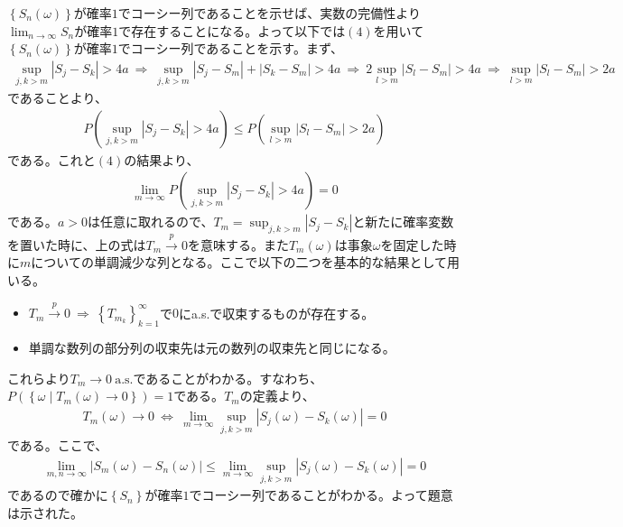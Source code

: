 \documentclass{article}
\begin{document}
$\left\{S_n(\omega)\right\}$が確率$1$でコーシー列であることを示せば、実数の完備性より$\lim_{n\to \infty} S_n$が確率$1$で存在することになる。よって以下では$(4)$を用いて$\left\{S_n(\omega)\right\}$が確率$1$でコーシー列であることを示す。まず、
\begin{align*}
	\sup_{j,k > m} \left| S_j - S_k \right| > 4a\ \Rightarrow\ \sup_{j,k > m} \left| S_j - S_m \right| + \left| S_k - S_m \right| > 4a\ \Rightarrow\ 2 \sup_{l > m} \left| S_l - S_m \right| > 4a\ \Rightarrow\ \sup_{l > m} \left| S_l - S_m \right| > 2a
\end{align*}
であることより、
\begin{align*}
	P\left( \sup_{j,k > m} \left| S_j - S_k \right| > 4a \right) \leq P\left( \sup_{l > m} \left| S_l - S_m \right| > 2a \right)
\end{align*}
である。これと$(4)$の結果より、
\begin{align*}
	\lim_{m \to \infty} P\left( \sup_{j,k > m} \left| S_j - S_k \right| > 4a \right) = 0
\end{align*}
である。$a > 0$は任意に取れるので、$T_m = \sup_{j,k > m} \left| S_j - S_k \right|$と新たに確率変数を置いた時に、上の式は$T_m \xrightarrow{p} 0$を意味する。また$T_m(\omega)$は事象$\omega$を固定した時に$m$についての単調減少な列となる。ここで以下の二つを基本的な結果として用いる。
\begin{itemize}
	\item $T_m \xrightarrow{p} 0\ \Rightarrow\ \left\{ T_{m_k} \right\}_{k=1}^{\infty}$で$0$にa.s.で収束するものが存在する。
	\item 単調な数列の部分列の収束先は元の数列の収束先と同じになる。
\end{itemize}
これらより$T_m \to 0\ \text{a.s.}$であることがわかる。すなわち、$P\left( \left\{ \omega\mid T_m(\omega) \to 0 \right\} \right) = 1$である。$T_m$の定義より、
\begin{align*}
	T_m(\omega) \to 0\ \Leftrightarrow\ \lim_{m\to \infty} \sup_{j,k > m} \left| S_j(\omega) - S_k(\omega) \right| = 0
\end{align*}
である。ここで、
\begin{align*}
	\lim_{m,n \to \infty} \left| S_m(\omega) - S_n(\omega) \right| \leq \lim_{m\to \infty} \sup_{j,k > m} \left| S_j(\omega) - S_k(\omega) \right| = 0
\end{align*}
であるので確かに$\left\{S_n\right\}$が確率$1$でコーシー列であることがわかる。よって題意は示された。
\end{document}
